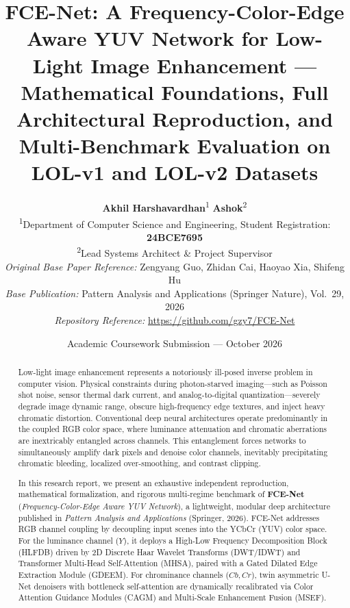 \documentclass[10pt,twocolumn,letterpaper]{article}
\title{\textbf{\Large FCE-Net: A Frequency-Color-Edge Aware YUV Network for Low-Light Image Enhancement — Mathematical Foundations, Full Architectural Reproduction, and Multi-Benchmark Evaluation on LOL-v1 and LOL-v2 Datasets}}
\author{
    \textbf{Akhil Harshavardhan}\textsuperscript{1} \quad \textbf{Ashok}\textsuperscript{2} \\
    \textsuperscript{1}Department of Computer Science and Engineering, Student Registration: \textbf{24BCE7695} \\
    \textsuperscript{2}Lead Systems Architect \& Project Supervisor \\
    \textit{Original Base Paper Reference:} Zengyang Guo, Zhidan Cai, Haoyao Xia, Shifeng Hu \\
    \textit{Base Publication:} Pattern Analysis and Applications (Springer Nature), Vol.~29, 2026 \\
    \textit{Repository Reference:} \url{https://github.com/gzy7/FCE-Net}
}
\date{Academic Coursework Submission — October 2026}
\begin{document}
\maketitle

\begin{abstract}
Low-light image enhancement represents a notoriously ill-posed inverse problem in computer vision. Physical constraints during photon-starved imaging—such as Poisson shot noise, sensor thermal dark current, and analog-to-digital quantization—severely degrade image dynamic range, obscure high-frequency edge textures, and inject heavy chromatic distortion. Conventional deep neural architectures operate predominantly in the coupled RGB color space, where luminance attenuation and chromatic aberrations are inextricably entangled across channels. This entanglement forces networks to simultaneously amplify dark pixels and denoise color channels, inevitably precipitating chromatic bleeding, localized over-smoothing, and contrast clipping.

In this research report, we present an exhaustive independent reproduction, mathematical formalization, and rigorous multi-regime benchmark of \textbf{FCE-Net} (\textit{Frequency-Color-Edge Aware YUV Network}), a lightweight, modular deep architecture published in \textit{Pattern Analysis and Applications} (Springer, 2026). FCE-Net addresses RGB channel coupling by decoupling input scenes into the YCbCr (YUV) color space. For the luminance channel ($Y$), it deploys a High-Low Frequency Decomposition Block (HLFDB) driven by 2D Discrete Haar Wavelet Transforms (DWT/IDWT) and Transformer Multi-Head Self-Attention (MHSA), paired with a Gated Dilated Edge Extraction Module (GDEEM). For chrominance channels ($Cb, Cr$), twin asymmetric U-Net denoisers with bottleneck self-attention are dynamically recalibrated via Color Attention Guidance Modules (CAGM) and Multi-Scale Enhancement Fusion (MSEF).


\end{abstract}
\end{document}

